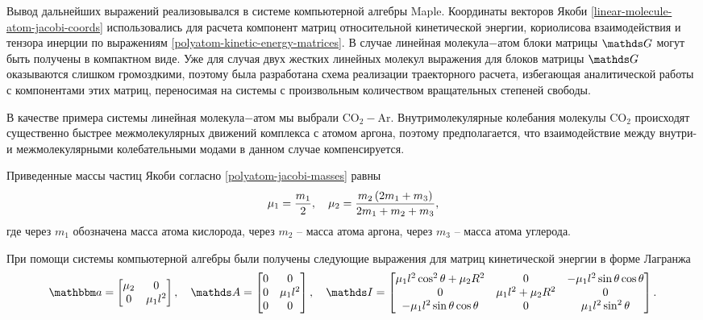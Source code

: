 Вывод дальнейших выражений реализовывался в системе компьютерной алгебры Maple. Координаты векторов Якоби \eqref{linear-molecule-atom-jacobi-coords} использовались для расчета компонент матриц относительной кинетической энергии, кориолисова взаимодействия и тензора инерции по выражениям \eqref{polyatom-kinetic-energy-matrices}. В случае линейная молекула$-$атом блоки матрицы $\bbG$ могут быть получены в компактном виде. Уже для случая двух жестких линейных молекул выражения для блоков матрицы $\bbG$ оказываются слишком громоздкими, поэтому была разработана схема реализации траекторного расчета, избегающая аналитической работы с компонентами этих матриц, переносимая на системы с произвольным количеством вращательных степеней свободы. \par
В качестве примера системы линейная молекула$-$атом мы выбрали CO$_2-$Ar. Внутримолекулярные колебания молекулы CO$_2$ происходят существенно быстрее межмолекулярных движений комплекса с атомом аргона, поэтому предполагается, что взаимодействие между внутри- и межмолекулярными колебательными модами в данном случае компенсируется. \par
Приведенные массы частиц Якоби согласно \eqref{polyatom-jacobi-masses} равны
\begin{gather}
    \mu_1 = \frac{m_1}{2}, \quad \mu_2 = \frac{m_2 \left( 2 m_1 + m_3 \right)}{2 m_1 + m_2 + m_3},
\end{gather}
% 
где через $m_1$ обозначена масса атома кислорода, через $m_2$ -- масса атома аргона, через $m_3$ -- масса атома углерода. \par
При помощи системы компьютерной алгебры были получены следующие выражения для матриц кинетической энергии в форме Лагранжа
\begin{gather}
	\bba =
	\begin{bmatrix}
		\mu_2 & 0 \\
		0 & \mu_1 l^2
	\end{bmatrix}, \quad 
	\bbA = 
	\begin{bmatrix}
		0 & 0 \\
		0 & \mu_1 l^2 \\
		0 & 0 
	\end{bmatrix}, \quad
	\bbI = 
	\begin{bmatrix}
		\mu_1 l^2 \cos^2 \theta + \mu_2 R^2 & 0 & -\mu_1 l^2 \sin \theta \cos \theta \\
		0 & \mu_1 l^2 + \mu_2 R^2 & 0 \\
		- \mu_1 l^2 \sin \theta \cos \theta & 0 & \mu_1 l^2 \sin^2 \theta
	\end{bmatrix}. \notag
\end{gather}

